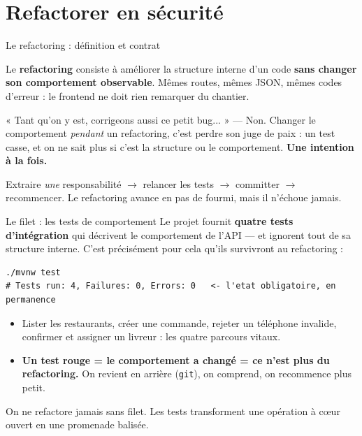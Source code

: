 \documentclass[aspectratio=169,11pt]{beamer}
\begin{document}
\section{Refactorer en sécurité}

\begin{frame}{Le refactoring : définition et contrat}
\begin{ucaddef}[Définition]
{\small Le \textbf{refactoring} consiste à améliorer la structure interne d'un code \textbf{sans changer son comportement observable}. Mêmes routes, mêmes JSON, mêmes codes d'erreur : le frontend ne doit rien remarquer du chantier.}
\end{ucaddef}
\begin{ucadpiege}
{\small « Tant qu'on y est, corrigeons aussi ce petit bug... » — Non. Changer le comportement \emph{pendant} un refactoring, c'est perdre son juge de paix : un test casse, et on ne sait plus si c'est la structure ou le comportement. \textbf{Une intention à la fois.}}
\end{ucadpiege}
\begin{ucadrec}
{\small Extraire \emph{une} responsabilité $\to$ relancer les tests $\to$ committer $\to$ recommencer. Le refactoring avance en pas de fourmi, mais il n'échoue jamais.}
\end{ucadrec}
\end{frame}

\begin{frame}[fragile]{Le filet : les tests de comportement}
{\small Le projet fournit \textbf{quatre tests d'intégration} qui décrivent le comportement de l'API — et ignorent tout de sa structure interne. C'est précisément pour cela qu'ils survivront au refactoring :}
\begin{lstlisting}
./mvnw test
# Tests run: 4, Failures: 0, Errors: 0   <- l'etat obligatoire, en permanence
\end{lstlisting}
\begin{itemize}\small
  \item Lister les restaurants, créer une commande, rejeter un téléphone invalide, confirmer et assigner un livreur : les quatre parcours vitaux.
  \item \textbf{Un test rouge = le comportement a changé = ce n'est plus du refactoring.} On revient en arrière (\texttt{git}), on comprend, on recommence plus petit.
\end{itemize}
\begin{ucadret}[À retenir]
{\small On ne refactore jamais sans filet. Les tests transforment une opération à c\oe ur ouvert en une promenade balisée.}
\end{ucadret}
\end{frame}
\end{document}
